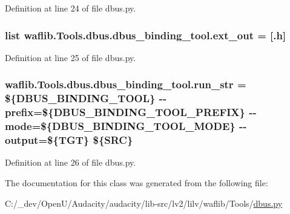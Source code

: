 Definition at line 24 of file dbus.\+py.

\subsubsection[{\texorpdfstring{ext\+\_\+out}{ext_out}}]{\setlength{\rightskip}{0pt plus 5cm}list waflib.\+Tools.\+dbus.\+dbus\+\_\+binding\+\_\+tool.\+ext\+\_\+out = \mbox{[}\textquotesingle{}.h\textquotesingle{}\mbox{]}\hspace{0.3cm}{\ttfamily [static]}}\hypertarget{classwaflib_1_1_tools_1_1dbus_1_1dbus__binding__tool_a7bf8e16b08b9a8528e108e0ff3deb8e7}{}\label{classwaflib_1_1_tools_1_1dbus_1_1dbus__binding__tool_a7bf8e16b08b9a8528e108e0ff3deb8e7}


Definition at line 25 of file dbus.\+py.

\subsubsection[{\texorpdfstring{run\+\_\+str}{run_str}}]{ waflib.\+Tools.\+dbus.\+dbus\+\_\+binding\+\_\+tool.\+run\+\_\+str = \textquotesingle{}\$\{D\+B\+U\+S\+\_\+\+B\+I\+N\+D\+I\+N\+G\+\_\+\+T\+O\+OL\} -\/-\/{\bf prefix}=\$\{D\+B\+U\+S\+\_\+\+B\+I\+N\+D\+I\+N\+G\+\_\+\+T\+O\+O\+L\+\_\+\+P\+R\+E\+F\+IX\} -\/-\/mode=\$\{D\+B\+U\+S\+\_\+\+B\+I\+N\+D\+I\+N\+G\+\_\+\+T\+O\+O\+L\+\_\+\+M\+O\+DE\} -\/-\/{\bf output}=\$\{T\+GT\} \$\{S\+RC\}\textquotesingle{}\hspace{0.3cm}{\ttfamily [static]}}\hypertarget{classwaflib_1_1_tools_1_1dbus_1_1dbus__binding__tool_aa0eaad96b0eeb12a4486269aed1e7aae}{}\label{classwaflib_1_1_tools_1_1dbus_1_1dbus__binding__tool_aa0eaad96b0eeb12a4486269aed1e7aae}


Definition at line 26 of file dbus.\+py.



The documentation for this class was generated from the following file\+:\begin{DoxyCompactItemize}
\item 
C\+:/\+\_\+dev/\+Open\+U/\+Audacity/audacity/lib-\/src/lv2/lilv/waflib/\+Tools/\hyperlink{lilv_2waflib_2_tools_2dbus_8py}{dbus.\+py}\end{DoxyCompactItemize}
